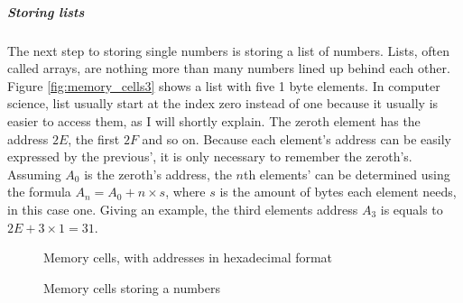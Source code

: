\documentclass[10pt,a4paper,titlepage]{article}
\begin{document}
	\subparagraph{Storing lists}
	The next step to storing single numbers is storing a list of numbers. Lists, often called arrays, are nothing more than many numbers lined up behind each other. Figure \ref{fig:memory_cells3} shows a list with five 1 byte elements. In computer science, list usually start at the index zero instead of one because it usually is easier to access them, as I will shortly explain. The zeroth element has the address \(2E\), the first \(2F\) and so on. Because each element's address can be easily expressed by the previous', it is only necessary to remember the zeroth's. Assuming \(A_{0}\) is the zeroth's address, the \(n\)th elements' can be determined using the formula \(A_{n}=A_{0} + n \times s\), where \(s\) is the amount of bytes each element needs, in this case one. Giving an example, the third elements address \(A_{3}\) is equals to \(2E + 3 \times 1 = 31\).
	\cite{howstuffworks}
	\begin{figure}
		\centering
		\caption{Memory cells, with addresses in hexadecimal format}
		\label{fig:memory_cells1}
	\end{figure}
	
	\begin{figure}
		\centering
		\caption{Memory cells storing a numbers}
		\label{fig:memory_cells2}
	\end{figure}
	
\end{document}
